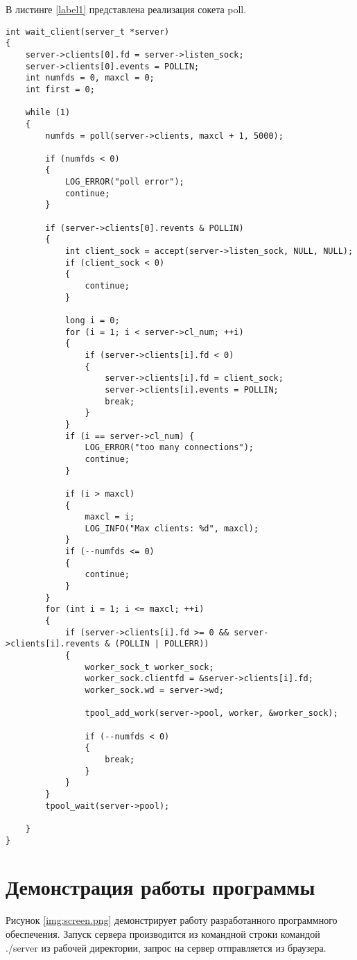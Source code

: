 В листинге \ref{label1} представлена реализация сокета poll.

\begin{lstlisting}[caption=Функции применения сокета poll, label={label1}]
int wait_client(server_t *server)
{
	server->clients[0].fd = server->listen_sock;
	server->clients[0].events = POLLIN;
	int numfds = 0, maxcl = 0;
	int first = 0;

	while (1)
	{
		numfds = poll(server->clients, maxcl + 1, 5000);

		if (numfds < 0)
		{
			LOG_ERROR("poll error");
			continue;
		}

		if (server->clients[0].revents & POLLIN)
		{
			int client_sock = accept(server->listen_sock, NULL, NULL);
			if (client_sock < 0)
			{
				continue;
			}

			long i = 0;
			for (i = 1; i < server->cl_num; ++i)
			{
				if (server->clients[i].fd < 0)
				{
					server->clients[i].fd = client_sock;
					server->clients[i].events = POLLIN;
					break;
				}
			}
			if (i == server->cl_num) {
				LOG_ERROR("too many connections");
				continue;
			}

			if (i > maxcl)
			{
				maxcl = i;
				LOG_INFO("Max clients: %d", maxcl);
			}
			if (--numfds <= 0)
			{
				continue;
			}
		}
		for (int i = 1; i <= maxcl; ++i)
		{
			if (server->clients[i].fd >= 0 && server->clients[i].revents & (POLLIN | POLLERR))
			{
				worker_sock_t worker_sock;
				worker_sock.clientfd = &server->clients[i].fd;
				worker_sock.wd = server->wd;

				tpool_add_work(server->pool, worker, &worker_sock);

				if (--numfds < 0)
				{
					break;
				}
			}
		}
		tpool_wait(server->pool);

	}
}

\end{lstlisting}



\section{Демонстрация работы программы}
Рисунок \ref{img:screen.png} демонстрирует работу разработанного программного обеспечения. Запуск сервера производится из командной строки командой ./server из рабочей директории, запрос на сервер отправляется из браузера.

